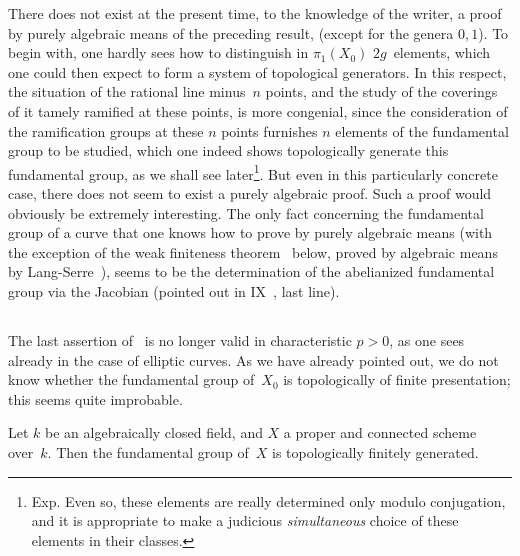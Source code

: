 \begin{remarks}
\label{X.2.7}
There does not exist at the present time, to the knowledge of the
writer, a proof by purely
algebraic means of the preceding result, (except for the genera
$0,1$). To begin with, one hardly sees how to distinguish in
$\pi_1(X_0)$ $2g$~elements, which one could then expect
to form a system of topological
generators. In this respect, the situation of the rational
line minus~$n$ points, and the study of the
coverings of it tamely ramified at these
points, is more congenial, since the consideration of the ramification groups
at these $n$ points furnishes $n$ elements of the
fundamental group to be studied, which one indeed shows
topologically generate this fundamental group, as we shall see
later\footnote{\Cf Exp\ptbl {}. Even so, these
elements are really determined only modulo
conjugation, and it is appropriate to make a judicious \emph{simultaneous}
choice of these elements in their classes.}. But even
in this particularly concrete case, there does not seem to exist
a purely algebraic proof. Such a
proof would obviously be extremely
interesting. The only fact concerning the fundamental group of a
curve that one knows how to prove by purely algebraic means
(with the exception of the weak finiteness theorem~
below, proved by algebraic means by Lang-Serre~\cite{X.2}),
seems to be the determination of the abelianized fundamental group
via the Jacobian (pointed out in IX~, last
line).
\end{remarks}

\subsection{}
\label{X.2.8}
The last assertion of~ is no longer valid in
characteristic $p>0$, as one sees already in the case of
elliptic curves. As we have already pointed out, we
do not know whether the fundamental group of~$X_0$ is topologically of
finite presentation; this seems quite improbable.

\begin{theorem}
\label{X.2.9}
Let $k$ be an algebraically closed field, and $X$ a proper and
connected scheme over~$k$. Then the fundamental group of~$X$ is
topologically finitely generated.
\end{theorem}

